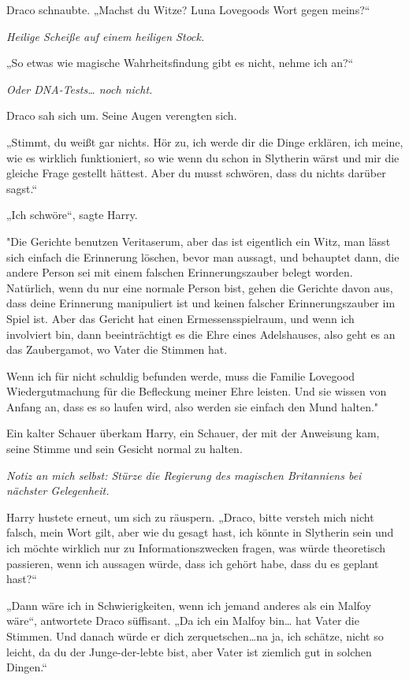 {Draco schnaubte. „Machst du Witze? Luna Lovegoods Wort gegen meins?“

\emph{Heilige Scheiße auf einem heiligen Stock.}

„So etwas wie magische Wahrheitsfindung gibt es nicht, nehme ich an?“

\emph{Oder DNA-Tests… noch nicht.}

Draco sah sich um. Seine Augen verengten sich.

„Stimmt, du weißt gar nichts. Hör zu, ich werde dir die Dinge erklären, ich meine, wie es wirklich funktioniert, so wie wenn du schon in Slytherin wärst und mir die gleiche Frage gestellt hättest. Aber du musst schwören, dass du nichts darüber sagst.“

„Ich schwöre“, sagte Harry.

"Die Gerichte benutzen Veritaserum, aber das ist eigentlich ein Witz, man lässt sich einfach die Erinnerung löschen, bevor man aussagt, und behauptet dann, die andere Person sei mit einem falschen Erinnerungszauber belegt worden. Natürlich, wenn du nur eine normale Person bist, gehen die Gerichte davon aus, dass deine Erinnerung manipuliert ist und keinen falscher Erinnerungszauber im Spiel ist. Aber das Gericht hat einen Ermessensspielraum, und wenn ich involviert bin, dann beeinträchtigt es die Ehre eines Adelshauses, also geht es an das Zaubergamot, wo Vater die Stimmen hat.

Wenn ich für nicht schuldig befunden werde, muss die Familie Lovegood Wiedergutmachung für die Befleckung meiner Ehre leisten. Und sie wissen von Anfang an, dass es so laufen wird, also werden sie einfach den Mund halten."

Ein kalter Schauer überkam Harry, ein Schauer, der mit der Anweisung kam, seine Stimme und sein Gesicht normal zu halten.

\emph{Notiz an mich selbst: Stürze die Regierung des magischen Britanniens bei nächster Gelegenheit.}

Harry hustete erneut, um sich zu räuspern. „Draco, bitte versteh mich nicht falsch, mein Wort gilt, aber wie du gesagt hast, ich könnte in Slytherin sein und ich möchte wirklich nur zu Informationszwecken fragen, was würde theoretisch passieren, wenn ich aussagen würde, dass ich gehört habe, dass du es geplant hast?“

„Dann wäre ich in Schwierigkeiten, wenn ich jemand anderes als ein Malfoy wäre“, antwortete Draco süffisant. „Da ich ein Malfoy bin… hat Vater die Stimmen. Und danach würde er dich zerquetschen…na ja, ich schätze, nicht so leicht, da du der Junge-der-lebte bist, aber Vater ist ziemlich gut in solchen Dingen.“

}
